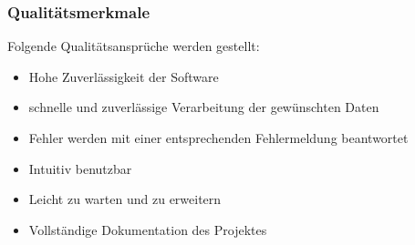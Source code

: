 \subsubsection{Qualitätsmerkmale}
Folgende Qualitätsansprüche werden gestellt:
\begin{itemize}
	\item Hohe Zuverlässigkeit der Software
	\item schnelle und zuverlässige Verarbeitung der gewünschten Daten
	\item Fehler werden mit einer entsprechenden Fehlermeldung beantwortet
	\item Intuitiv benutzbar
	\item Leicht zu warten und zu erweitern
	\item Vollständige Dokumentation des Projektes
\end{itemize}









